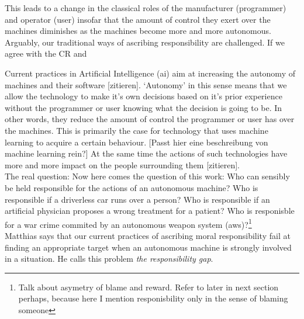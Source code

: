 \documentclass{article}
\begin{document}

This leads to a change in the classical roles of the manufacturer
(programmer) and operator (user) insofar that the amount of control they exert
over the machines diminishes as the machines become more and more autonomous.
Arguably, our traditional ways of ascribing responsibility are challenged. If we
agree with the CR and 


Current practices in Artificial Intelligence (\acrshort{ai}) aim at increasing
the autonomy of machines and their software [zitieren]. `Autonomy' in this sense
means that we allow the technology to make it's own decisions based on it's
prior experience without the programmer or user knowing what the decision is
going to be. In other words, they reduce the amount of control the programmer or
user has over the machines. This is primarily the case for technology that uses
machine learning to acquire a certain behaviour. [Passt hier eine beschreibung
von machine learning rein?] At the same time the actions of
such technologies have more and more impact on the people surrounding them
[zitieren].\\

The real question:
Now here comes the question of this work: Who can sensibly be held responsible for the
actions of an autonomous machine?
Who is responsible if a driverless car runs over a person? Who is responsible if
an artificial physician proposes a wrong treatment for a patient? Who is
responisble for a war crime commited by an autonomous weapon system
(\acrshort{aws})?\footnote{Talk about asymetry of blame and reward. Refer to
later in next section perhaps, because here I mention responisbility only in the
sense of blaming someone}\\

Matthias says that our current practices of ascribing moral responsibility
fail at finding an appropriate target when an autonomous machine is
strongly involved in a situation. He calls this problem \textit{the
responsibility gap}.\\
\end{document}
